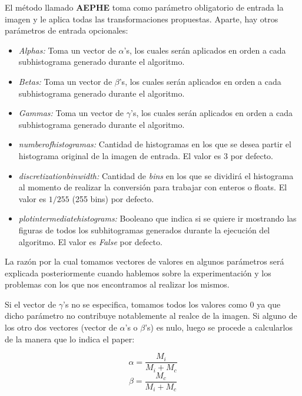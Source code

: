 \documentclass[10pt, a4paper]{article}
\begin{document}
El método llamado \textbf{AEPHE} toma como parámetro obligatorio de entrada la imagen y le aplica todas las transformaciones propuestas. Aparte, hay otros parámetros de entrada opcionales:
\begin{itemize}
\item \textit{Alphas:} Toma un vector de $\alpha$'s, los cuales serán aplicados en orden a cada subhistograma generado durante el algoritmo.
\item \textit{Betas:}  Toma un vector de $\beta$'s, los cuales serán aplicados en orden a cada subhistograma generado durante el algoritmo.
\item \textit{Gammas:} Toma un vector de $\gamma$'s, los cuales serán aplicados en orden a cada subhistograma generado durante el algoritmo.
\item \textit{number\textunderscore of\textunderscore histogramas:} Cantidad de histogramas en los que se desea partir el histograma original de la imagen de entrada. El valor es $3$ por defecto.
\item \textit{discretization\textunderscore bin\textunderscore width:} Cantidad de \textit{bins} en los que se dividirá el histograma al momento de realizar la conversión para trabajar con enteros o floats. El valor es $1/255$ (255 bins) por defecto. 
\item \textit{plot\textunderscore intermediate\textunderscore histograms:} Booleano que indica si se quiere ir mostrando las figuras de todos los subhitogramas generados durante la ejecución del algoritmo. El valor es \textit{False} por defecto.
\end{itemize}

La razón por la cual tomamos vectores de valores en algunos parámetros será explicada posteriormente cuando hablemos sobre la experimentación y los problemas con los que nos encontramos al realizar los mismos.

Si el vector de $\gamma$'s no se especifica, tomamos todos los valores como 0 ya que dicho parámetro no contribuye notablemente al realce de la imagen. Si alguno de los otro dos vectores (vector de $\alpha$'s o $\beta$'s) es nulo, luego se procede a calcularlos de la manera que lo indica el paper:

\begin{equation}
\alpha = \dfrac{M_{i}}{M_{i} + M_{c}}
\end{equation}
\begin{equation}
\beta = \dfrac{M_{c}}{M_{i} + M_{c}}
\end{equation}
\end{document}
